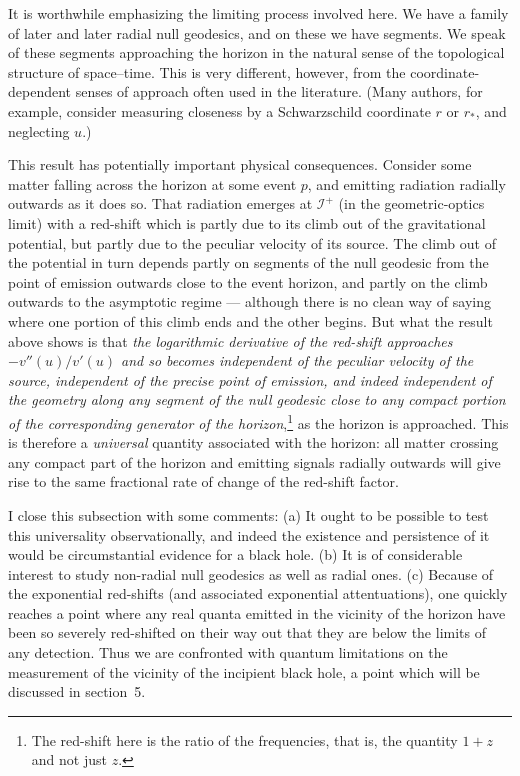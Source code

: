 \documentclass[
%
draft    %
,numberedheadings 
,bibliocites
  ]
  {aipproc}
\newcommand{\scrif}{{{\mathscr I}^{+}}}
\newcommand{\vv}{{v}}
\begin{document}
It is worthwhile emphasizing the limiting process involved here.  We have a family of later and later radial null geodesics, and on these we have segments.  We speak of these segments approaching the horizon in the natural sense of the topological structure of space--time.  This is very different, however, from the 
coordinate-dependent senses of approach often used in the literature.  (Many authors, for example, consider measuring closeness by a Schwarzschild coordinate $r$ or $r_*$, and neglecting $u$.)  

This result has potentially important physical consequences.  Consider some matter falling across the horizon at some event $p$, and emitting radiation radially outwards as it does so.  That radiation emerges at $\scrif$ (in the geometric-optics limit) with a red-shift which is partly due to its climb out of the gravitational potential, but partly due to the peculiar velocity of its source. 
The climb out of the potential in turn depends partly on segments of the null geodesic from the point of emission outwards close to the event horizon, and partly on the climb outwards to the asymptotic regime --- although there is no clean way of saying where one portion of this climb ends and the other begins.  But
what the result above shows is that {\em the logarithmic derivative of the red-shift approaches
$-\vv ''(u)/\vv' (u)$ and so becomes independent of the peculiar velocity of the source, independent of the precise point of emission, and indeed independent of the geometry along any segment of the null geodesic close to any compact portion of the corresponding generator of the horizon},\footnote{The red-shift here is the ratio of the frequencies, that is, the quantity $1+z$ and not just $z$.}  as the horizon is approached.  This is therefore a {\em universal} quantity associated with the horizon:  all matter crossing any compact part of the horizon and emitting signals radially outwards will give rise to the same fractional rate of change of the red-shift factor.

I close this subsection with some comments:  
(a) It ought to be possible to test this universality observationally, and indeed the existence and persistence of it would be circumstantial evidence for a black hole.
(b) It is of considerable interest to study non-radial null geodesics as well as radial ones.
(c) Because of the exponential red-shifts (and associated exponential attentuations), one quickly reaches a point where any real quanta emitted in the vicinity of the horizon have been so severely 
red-shifted on their way out that they are below the limits of any detection.  Thus we are confronted with quantum limitations on the measurement of the vicinity of the incipient black 
hole, a point which will be discussed in section~5.
\end{document}
